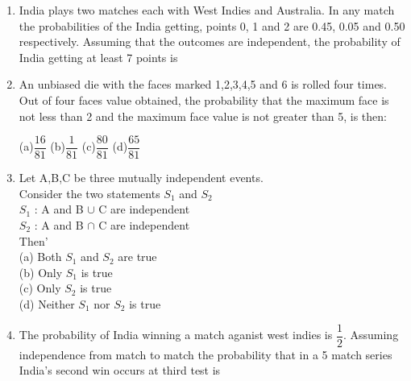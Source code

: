 \documentclass[journal,12pt,twocolumn]{IEEEtran}
\begin{document}
\begin{enumerate}[label=\arabic*]
	\begin{multicols}{4}
	(a)$\dfrac{1}{2}$		(b)$\dfrac{49}{101}$		(c)$\dfrac{50}{101}$	(d)$\dfrac{51}{101}$
	\end{multicols}
	\item India plays two matches each with West Indies and Australia. In any match the probabilities of the India getting, points 0, 1 and 2 are 0.45, 0.05 and 0.50 respectively. Assuming that the outcomes are independent, the probability of India getting at least 7 points is
	\begin{itemize}
	\begin{multicols}{2}
	\item[(a)]0.8750		\item[(b)]0.0875		\item[(c)]0.0625		\item[(d)]0.0250
	\end{multicols}
	\end{itemize}
	\item An unbiased die with the faces marked 1,2,3,4,5 and 6 is rolled four times. Out of four faces value obtained, the probability that the maximum face is not less than 2 and the maximum face value is not greater than 5, is then:
	\begin{multicols}{4}
	(a)$\dfrac{16}{81}$  (b)$\dfrac{1}{81}$  	(c)$\dfrac{80}{81}$     (d)$\dfrac{65}{81}$	
	\end{multicols}
	\item Let A,B,C be  three mutually independent events.\\
	Consider the two statements $S_1$ and $S_2$\\
	$S_1$ : A and B $\cup$ C are independent\\ 	 
	$S_2$ : A and B $\cap$ C are independent\\
	Then'\\
	(a) Both $S_1$ and $S_2$ are true\\
	(b) Only $S_1$ is true\\
	(c) Only $S_2$ is true\\
	(d) Neither $S_1$ nor $S_2$ is true\\
	\item The probability of India winning a match aganist west indies is $\dfrac{1}{2}$. Assuming independence from match to match the probability  that in a 5 match series India's second win occurs at third test is
	\begin{itemize}
	\begin{multicols}{4}
	\item[(a)]$\dfrac{1}{8}$   \item[(b)]$\dfrac{1}{4}$    \item[(c)]$\dfrac{1}{2}$   \item[(d)]$\dfrac{2}{3}$

\end{multicols}
\end{itemize}
\end{enumerate}
\end{document}
